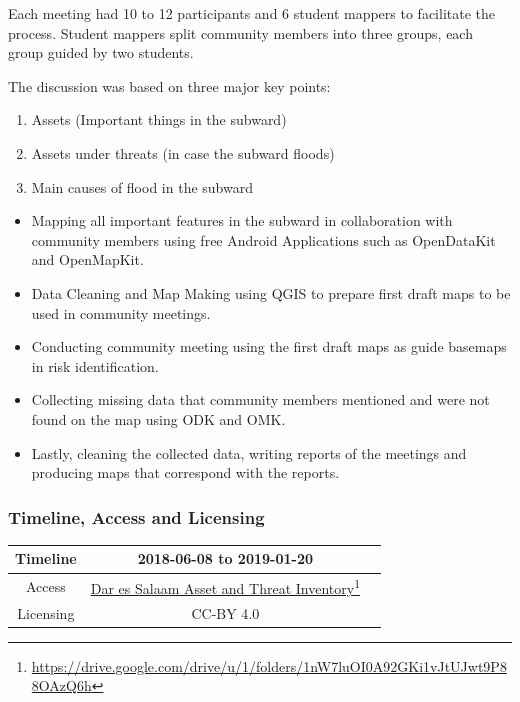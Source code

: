 \documentclass[a4paper,12pt,twoside]{article}
\begin{document}
Each meeting had 10 to 12 participants and 6 student mappers to facilitate the process. Student mappers split community members into three groups, each group guided by two students.

The discussion was based on three major key points:
\begin{enumerate}
    \item Assets (Important things in the subward)
    \item Assets under threats (in case the subward floods)
    \item Main causes of flood in the subward
\end{enumerate}

\begin{itemize}
    \item Mapping all important features in the subward in collaboration with community members using free Android Applications such as OpenDataKit and OpenMapKit.
    \item Data Cleaning and Map Making using QGIS to prepare first draft maps to be used in community meetings.
    \item Conducting community meeting using the first draft maps as guide basemaps in risk identification.
    \item Collecting missing data that community members mentioned and were not found on the map using ODK and OMK.
    \item Lastly, cleaning the collected data, writing reports of the meetings and producing maps that correspond with the reports.
\end{itemize}

\subsubsection{Timeline, Access and Licensing}
\begin{center}
\begin{tabular}{|c|c|c|}  
 \hline
  Timeline  &   2018-06-08 to 2019-01-20 \\
\hline  
 Access  & 
    \href{https://drive.google.com/drive/u/1/folders/1nW7luOI0A92GKi1vJtUJwt9P88OAzQ6h}{Dar es Salaam Asset and Threat Inventory}\footnote{\url{https://drive.google.com/drive/u/1/folders/1nW7luOI0A92GKi1vJtUJwt9P88OAzQ6h}} \\
   
\hline 
    Licensing & CC-BY 4.0 \\
\hline
\end{tabular}
\end{center}
\end{document}

